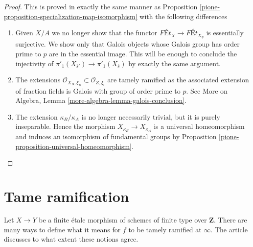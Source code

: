 \begin{proof}

This is proved in exactly the same manner as
Proposition \ref{pione-proposition-specialization-map-isomorphism}
with the following differences
\begin{enumerate}
\item Given $X/A$ we no longer show that the functor
$\textit{F\'Et}_X \to \textit{F\'Et}_{X_{\overline{\eta}}}$
is essentially surjective. We show only that Galois objects
whose Galois group has order prime to $p$ are in the essential
image. This will be enough to conclude the injectivity of
$\pi'_1(X_{\overline{s}'}) \to \pi'_1(X_{\overline{s}})$ by
exactly the same argument.
\item The extensions
$\mathcal{O}_{X_B, \xi_B} \subset \mathcal{O}_{Z, \xi_i}$
are tamely ramified as the associated extension of fraction
fields is Galois with group of order prime to $p$. See
More on Algebra, Lemma \ref{more-algebra-lemma-galois-conclusion}.
\item The extension $\kappa_B/\kappa_A$ is no longer
necessarily trivial, but it is purely inseparable.
Hence the morphism $X_{\kappa_B} \to X_{\kappa_A}$
is a universal homeomorphism and induces an isomorphism
of fundamental groups by Proposition \ref{pione-proposition-universal-homeomorphism}.
\end{enumerate}
\end{proof}

\section{Tame ramification}
\label{pione-section-tame}
Let $X \to Y$ be a finite \'etale morphism of schemes of finite type
over $\mathbf{Z}$. There are many ways to define what it means for $f$
to be tamely ramified at $\infty$. The article \cite{Kerz-Schmidt}
discusses to what extent these notions agree.

